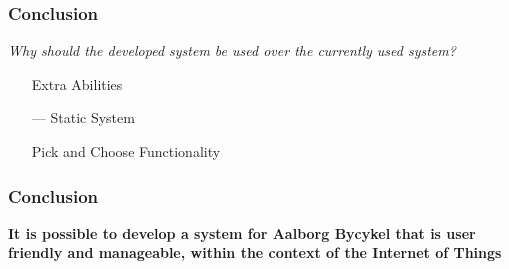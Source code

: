 \begin{frame}
	\frametitle{Conclusion}
	\begin{center}
		\textit{Why should the developed system be used over the currently used system?}
	\end{center}
	
	\begin{itemize}
		\item[\color{green}\checkmark] Extra Abilities
		\item[\color{orange}---] Static System
		\item[\color{green}\checkmark] Pick and Choose Functionality
	\end{itemize}
\end{frame}

\begin{frame}
	\frametitle{Conclusion}
	\begin{center}
		\textbf{It is possible to develop a system for Aalborg Bycykel that is user friendly and manageable, within the context of the Internet of Things}
	\end{center}
\end{frame}
